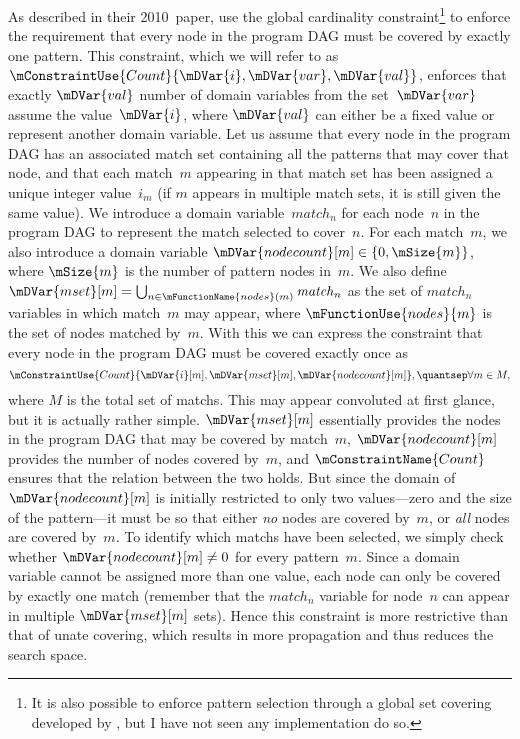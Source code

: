 As described in their 2010~paper, \citeauthor{Floch2010} use the \gls{global
  cardinality constraint}\footnote{It is also possible to enforce \gls{pattern
    selection} through a global set covering developed by
  \textcite{Mouthuy2007}, but I have not seen any implementation do so.} to
enforce the requirement that every \gls{node} in the \gls{program DAG} must be
covered by exactly one \gls{pattern}.
%
This constraint, which we will refer to as
\mbox{$\mConstraintUse{Count}{\mDVar{i}, \mDVar{var}, \mDVar{val}}$}, enforces
that exactly $\mDVar{val}$ number of \glspl{domain variable} from the
set~$\mDVar{var}$ assume the value~$\mDVar{i}$, where $\mDVar{val}$ can either
be a fixed value or represent another \gls{domain variable}.
%
Let us assume that
every \gls{node} in the \gls{program DAG} has an associated \gls{match set}
containing all the \glspl{pattern} that may cover that \gls{node}, and that each
\gls{match}~$m$ appearing in that \gls{match set} has been assigned a unique
integer value~$i_m$ (if $m$ appears in multiple \glspl{match set}, it is still
given the same value).
%
We introduce a \gls{domain variable}~$\mathit{match}_n$
for each \gls{node}~$n$ in the \gls{program DAG} to represent the \gls{match}
selected to cover~$n$.
%
For each \gls{match}~$m$, we also introduce a \gls{domain
  variable} \mbox{$\mDVar{nodecount}[m] \in \mSet{0, \mSize{m}}$}, where
\mbox{$\mSize{m}$} is the number of \gls{pattern} \glspl{node} in~$m$.
%
We also
define \mbox{$\mDVar{mset}[m] = \bigcup_{n \in \mFunctionName{nodes}(m)}
  \mathit{match}_n$} as the set of $\mathit{match}_n$ variables in which
\gls{match}~$m$ may appear, where $\mFunctionUse{nodes}{m}$ is the set of
\glspl{node} matched by~$m$.
%
With this we can express the constraint that every
\gls{node} in the \gls{program DAG} must be covered exactly once as
%
\begin{displaymath}
  \mConstraintUse{Count}{\mDVar{i}[m], \mDVar{mset}[m], \mDVar{nodecount}[m]},
  \quantsep
  \forall m \in M,
\end{displaymath}
%
where $M$ is the total set of \glspl{match}.
%
This may appear convoluted at first
glance, but it is actually rather simple.
%
$\mDVar{mset}[m]$ essentially provides
the \glspl{node} in the \gls{program DAG} that may be covered by
\gls{match}~$m$, $\mDVar{nodecount}[m]$ provides the number of \glspl{node}
covered by~$m$, and $\mConstraintName{Count}$ ensures that the relation between
the two holds.
%
But since the domain of $\mDVar{nodecount}[m]$ is initially
restricted to only two values---zero and the size of the \gls{pattern}---it
must be so that either \emph{no} \glspl{node} are covered by~$m$, or \emph{all}
\glspl{node} are covered by~$m$.
%
To identify which \glspl{match} have been
selected, we simply check whether \mbox{$\mDVar{nodecount}[m] \neq 0$} for every
\gls{pattern}~$m$.
%
Since a \gls{domain variable} cannot be assigned more than
one value, each \gls{node} can only be covered by exactly one \gls{match}
(remember that the $\mathit{match}_n$ variable for \gls{node}~$n$ can appear in
multiple $\mDVar{mset}[m]$ sets).
%
Hence this constraint is more restrictive than
that of \gls{unate covering}, which results in more propagation and thus reduces
the search space.

